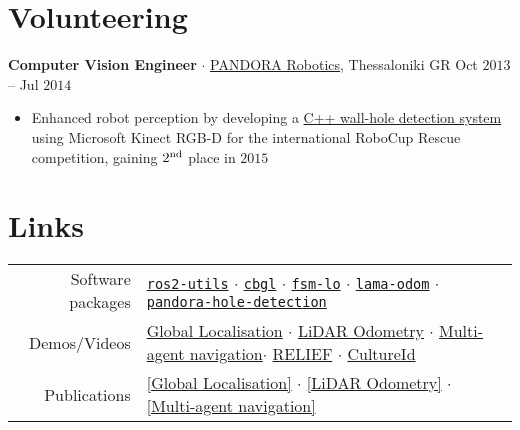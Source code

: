 \documentclass[a4paper,10pt,twoside]{article}
\newcommand{\verticalspacebetweensections}{\vspace{0em}}
\newcommand{\verticalspacebetweensectionandcontent}{\vspace{0.4em}}
\begin{document}
\section{\textbf{Volunteering}}\verticalspacebetweensectionandcontent

\noindent \textbf{Computer Vision Engineer} $\cdot$ \href{https://issel.ee.auth.gr/pandora-robotics/}{PANDORA Robotics}, Thessaloniki GR \hfill {\small \textcolor{datecolour}{Oct $2013$ -- Jul $2014$}}
  \begin{minipage}[t]{\textwidth}
    \begin{itemize}
      \item Enhanced robot perception by developing a \href{https://github.com/li9i/pandora\_vision\_2014}{C++ wall-hole detection system} using Microsoft Kinect RGB-D for the international RoboCup Rescue competition, gaining $2^{\textnormal{nd}}$ place in $2015$
    \end{itemize}
  \end{minipage}
\verticalspacebetweensections

\section{\textbf{Links}}\verticalspacebetweensectionandcontent

\begin{center}
\begin{tabular}{rl}
  Software packages &
  \href{https://github.com/li9i/ros2-utils}{\texttt{ros2-utils}} $\cdot$
  \href{https://github.com/li9i/cbgl}{\texttt{cbgl}} $\cdot$
  \href{https://github.com/fourier-scan-matcher/fsm}{\texttt{fsm-lo}} $\cdot$
  \href{https://github.com/li9i/lama-odom}{\texttt{lama-odom}} $\cdot$
  \href{https://github.com/li9i/pandora\_vision\_2014/tree/hydro-devel/pandora\_vision\_hole\_detector}{\texttt{pandora-hole-detection}} \\

  Demos/Videos &
  \href{https://www.youtube.com/watch?v=xaDKjI0WkDc}{\hphantom{[}Global Localisation\hphantom{]}} $\cdot$
  \href{https://www.youtube.com/watch?v=hB4qsHCEXGI}{\hphantom{[}LiDAR Odometry\hphantom{]}} $\cdot$
  \href{https://www.youtube.com/watch?v=937OZez1iN8}{\hphantom{[}Multi-agent navigation\hphantom{]}}$\cdot$
  \href{https://relief.web.auth.gr/#pg-72-1}{RELIEF} $\cdot$
  \href{https://cultureid.web.auth.gr/?page_id=200&lang=en#pl-200}{CultureId}
  \\
  Publications &
  \href{https://ieeexplore.ieee.org/abstract/document/10802235}{[Global Localisation]} $\cdot$
  \href{https://ieeexplore.ieee.org/abstract/document/9981228}{[LiDAR Odometry]} $\cdot$
  \href{https://www.tandfonline.com/doi/full/10.1080/00207179.2018.1514129}{[Multi-agent navigation]}
\end{tabular}
\end{center}
\verticalspacebetweensections
\end{document}
